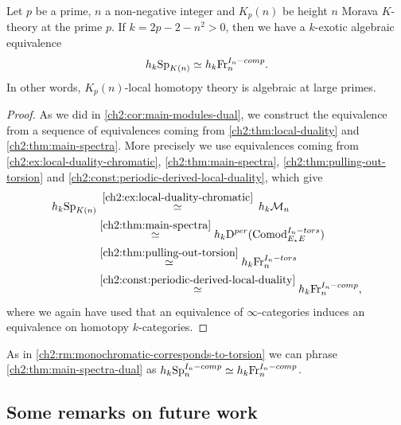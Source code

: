 \begin{theorem}
    \label{ch2:thm:main-spectra-dual}
    Let $p$ be a prime, $n$ a non-negative integer and $K_p(n)$ be height $n$ Morava $K$-theory at the prime $p$. If $k=2p-2-n^2>0$, then we have a $k$-exotic algebraic equivalence 
    $$h_k \mathrm{Sp}_{K(n)} \simeq h_k \mathrm{Fr}_{n}^{I_n-comp}.$$ 
    In other words, $K_p(n)$-local homotopy theory is algebraic at large primes. 
\end{theorem}
\begin{proof}
    As we did in \cref{ch2:cor:main-modules-dual}, we construct the equivalence from a sequence of equivalences coming from \cref{ch2:thm:local-duality} and \cref{ch2:thm:main-spectra}. More precisely we use equivalences coming from \cref{ch2:ex:local-duality-chromatic}, \cref{ch2:thm:main-spectra}, \cref{ch2:thm:pulling-out-torsion} and \cref{ch2:const:periodic-derived-local-duality}, which give
    \begin{align*}
        h_k \mathrm{Sp}_{K(n)}
        &\overset{\hspace{2pt}\ref{ch2:ex:local-duality-chromatic}\hspace{2pt}}
        \simeq 
        h_k \mathcal{M}_{n} \\
        &\overset{\ref{ch2:thm:main-spectra}}
        \simeq 
        h_k \mathrm{D}^{per}(\mathrm{Comod}_{E_*E}^{I_n-tors}) \\
        &\overset{\ref{ch2:thm:pulling-out-torsion}}
        \simeq 
        h_k \mathrm{Fr}_{n}^{I_n-tors} \\
        &\overset{\ref{ch2:const:periodic-derived-local-duality}}
        \simeq 
        h_k \mathrm{Fr}_{n}^{I_n-comp},
    \end{align*}
    where we again have used that an equivalence of $\infty$-categories induces an equivalence on homotopy $k$-categories.
\end{proof}

\begin{remark}
    As in \cref{ch2:rm:monochromatic-corresponds-to-torsion} we can phrase \cref{ch2:thm:main-spectra-dual} as $h_k\mathrm{Sp}_{n}^{I_n-comp}\simeq h_k\mathrm{Fr}_{n}^{I_n-comp}$. 
\end{remark}










\subsection*{Some remarks on future work}

